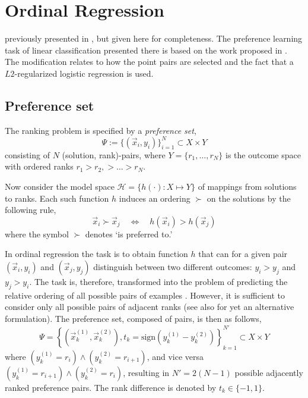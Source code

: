 
\chapter{Ordinal Regression}\label{ch:ordinal} 
 previously presented in 
\cite{Ru06:PPSN}, but given here for completeness. The preference learning task 
of linear classification presented there is based on the work proposed in 
\citep{main:LIBLINEAR,Lin08:newtontrustregion}. 
The modification relates to how the point pairs are selected and the fact that 
a $L2$-regularized logistic regression is used. 

\section{Preference set}
The ranking problem is specified by a \emph{preference set}, 
\begin{equation}
\Psi := \{(\vec{x}_i,y_i)\}_{i=1}^N \subset X \times Y
\end{equation}
consisting of $N$ (solution, rank)-pairs, where $Y=\{r_1,\ldots,r_N\}$ 
is the outcome space with ordered ranks $r_1> r_2,> \ldots > r_N$.  

Now consider the model space $\mathcal{H} = \{h(\cdot) : X \mapsto Y\}$ of 
mappings from solutions to ranks. Each such function $h$ induces an ordering 
$\succ$ on the solutions  by the following rule,
\begin{equation}\label{eq:linear}
	\vec{x}_i \succ \vec{x}_j \quad \Leftrightarrow \quad h(\vec{x}_i) > h(\vec{x}_j)
\end{equation}
where the symbol $\succ$ denotes `is preferred to.' 

In ordinal regression the task is to obtain function $h$ that can for a given pair $(\vec{x}_i,y_i)$ and $(\vec{x}_j,y_j)$ distinguish between two different outcomes: $y_i > y_j$ and $y_j > y_i$. The task is, therefore, transformed into the problem of predicting the relative ordering of all possible pairs of examples \citep{Herbrich00,Joachims02}.  However, it is sufficient to consider only all possible pairs of adjacent ranks (see also \cite{ShaweTaylor04:book} for yet an alternative formulation).  The preference set, composed of pairs, is then as follows,
\begin{equation}\label{eq:PrefSet:problem}
	\Psi = \left\{(\vec{x}_k^{(1)}, \vec{x}_k^{(2)}),t_k=\text{sign}(y_k^{(1)} 
	- y_k^{(2)})\right\}_{k=1}^{N'} \subset X\times Y  
\end{equation}
where $(y_k^{(1)} = r_i) \wedge (y_k^{(2)} = r_{i+1})$, and vice versa 
$(y_k^{(1)} = r_{i+1}) \wedge (y_k^{(2)} = r_{i})$, resulting in $N'=2(N-1)$ 
possible adjacently ranked preference pairs. The rank difference is denoted by 
$t_k\in\{-1,1\}$.

